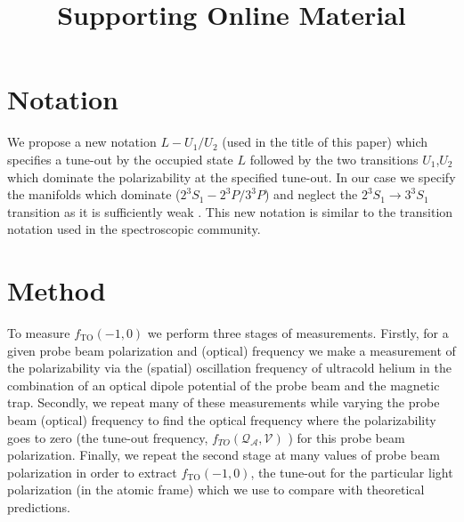 \documentclass[%
 amsmath,amssymb,
aps,
]{revtex4-2}
\newcommand{\MetastableState}{2^{3\!}S_1}%
\newcommand{\UpperStateManifold}{3^{3\!}P}%
\newcommand{\LowerStateManifold}{2^{3\!}P}%
\newcommand{\TO}{\MetastableState- \LowerStateManifold / \UpperStateManifold}%
\begin{document}
\title{Supporting Online Material}
\maketitle

\section{Notation}
We propose a new notation $L-U_1/U_2$ (used in the title of this paper) which specifies a tune-out by the occupied state $L$ followed by the two transitions $U_1$,$U_2$ which dominate the polarizability at the specified tune-out. In our case we specify the manifolds which dominate ($\TO$) and neglect the $\MetastableState \rightarrow 3^{3\!}S_1 $ transition as it is sufficiently weak \cite{PhysRevLett.125.013002}. This new notation is similar to the transition notation used in the spectroscopic community. 

\section{Method} 	
% 

To measure \(f_{\mathrm{TO}}(-1,0)\) we perform three stages of measurements. Firstly, for a given probe beam polarization and (optical) frequency we make a measurement of the polarizability via the (spatial) oscillation frequency of ultracold helium in the combination of an optical dipole potential of the probe beam and the magnetic trap. 
Secondly, we repeat many of these measurements while varying the probe beam (optical) frequency to find the optical frequency where the polarizability goes to zero (the tune-out frequency, \(f_{TO}(\mathcal{Q_A},\mathcal{V})\) ) for this probe beam polarization. 
Finally, we repeat the second stage at many values of probe beam polarization in order to extract  \(f_{\mathrm{TO}}(-1,0)\), the tune-out for the particular light polarization (in the atomic frame) which we use to compare with theoretical predictions.
\end{document}
